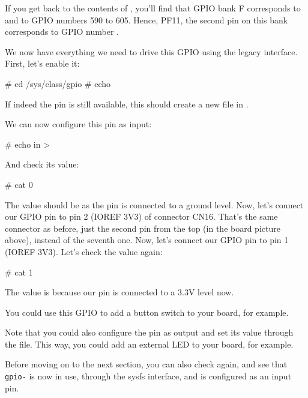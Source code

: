 If you get back to the contents of , you'll
find that GPIO bank F corresponds to  and to GPIO
numbers 590 to 605. Hence, PF11, the second pin on this bank corresponds to
GPIO number \gpionum.
\fi

We now have everything we need to drive this GPIO using the legacy
interface. First, let's enable it:

\begin{bashinput}
# cd /sys/class/gpio
# echo %
\end{bashinput}

If indeed the pin is still available, this should create a new
\code{\gpioname} file in .

We can now configure this pin as input:

\begin{bashinput}
# echo in > %
\end{bashinput}

And check its value:

\begin{bashinput}
# cat %
0
\end{bashinput}

The value should be  as the pin is connected to a ground level.
\if{}
Now, let's connect our GPIO pin to pin 2 (IOREF 3V3) of connector CN16.
That's the same connector as before, just the second pin from the top
(in the board picture above), instead of the seventh one.
\fi
\if{}
Now, let's connect our GPIO pin to pin 1 (IOREF 3V3).
\fi
Let's check the value again:

\begin{bashinput}
# cat %
1
\end{bashinput}

The value is  because our pin is connected to a 3.3V level now.

You could use this GPIO to add a button switch to your board, for
example.

Note that you could also configure the pin as output and set its value
through the  file. This way, you could add an external LED
to your board, for example.

Before moving on to the next section, you can also check
 again, and see that {\tt gpio-\gpionum} is now
in use, through the sysfs interface, and is configured as an input pin.


